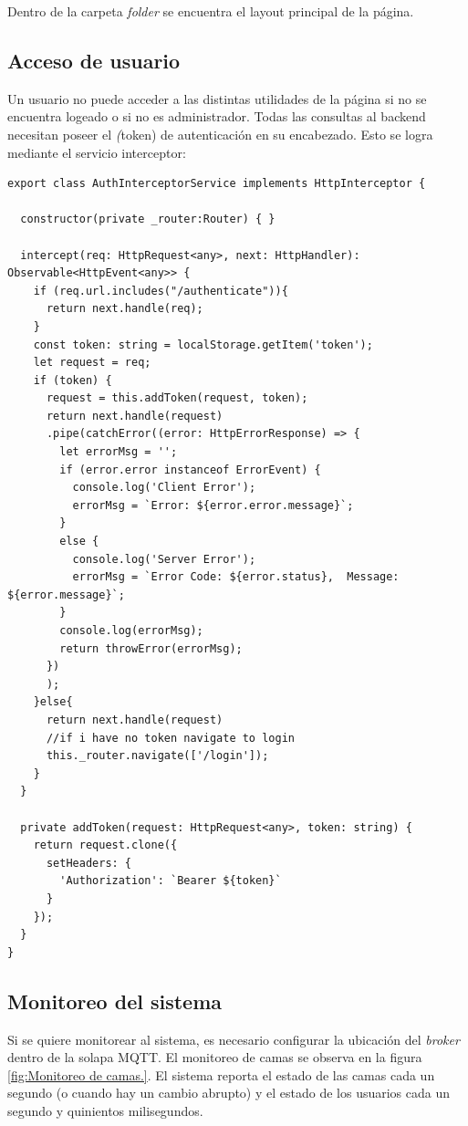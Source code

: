 Dentro de la carpeta \textit{folder} se encuentra el layout principal de la página.




\subsection{Acceso de usuario}

Un usuario no puede acceder a las distintas utilidades de la página si no se encuentra logeado o si no es administrador. Todas las consultas al backend necesitan poseer el \textit(token) de autenticación en su encabezado. Esto se logra mediante el servicio interceptor:


\begin{lstlisting}[caption=  Inserción de token]
export class AuthInterceptorService implements HttpInterceptor {

  constructor(private _router:Router) { }

  intercept(req: HttpRequest<any>, next: HttpHandler): Observable<HttpEvent<any>> {
    if (req.url.includes("/authenticate")){
      return next.handle(req);
    }
    const token: string = localStorage.getItem('token');
    let request = req;
	if (token) {
      request = this.addToken(request, token);
      return next.handle(request)
      .pipe(catchError((error: HttpErrorResponse) => {
        let errorMsg = '';
        if (error.error instanceof ErrorEvent) {
          console.log('Client Error');
          errorMsg = `Error: ${error.error.message}`;
        }
        else {
          console.log('Server Error');
          errorMsg = `Error Code: ${error.status},  Message: ${error.message}`;
        }
        console.log(errorMsg);
        return throwError(errorMsg);
      })
      );
    }else{
      return next.handle(request)
      //if i have no token navigate to login
      this._router.navigate(['/login']);
    }    
  }

  private addToken(request: HttpRequest<any>, token: string) {
    return request.clone({
      setHeaders: {
        'Authorization': `Bearer ${token}`
      }
    });
  }
}

\end{lstlisting}

\subsection{Monitoreo del sistema}
Si se quiere monitorear al sistema, es necesario configurar la ubicación del \textit{broker} dentro de la solapa MQTT. El monitoreo de camas se observa en la figura \ref{fig:Monitoreo de camas.}. El sistema reporta el estado de las camas cada un segundo (o cuando hay un cambio abrupto) y el estado de los usuarios cada un segundo y quinientos milisegundos.

